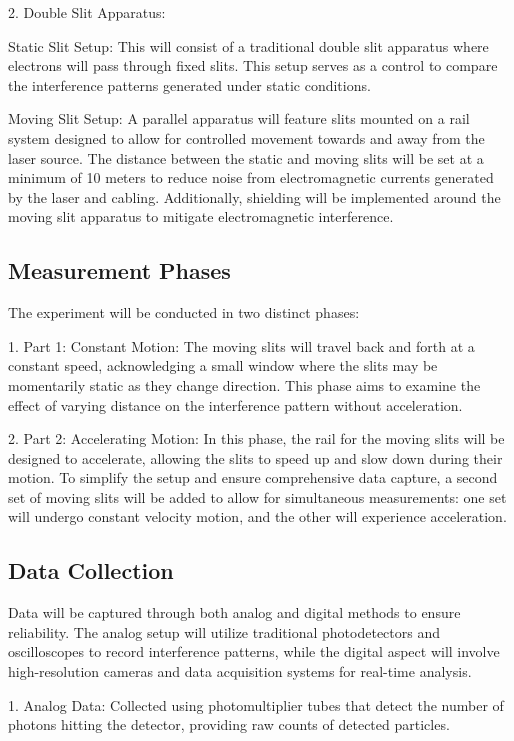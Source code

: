 \documentclass{article}
\begin{document}
2. Double Slit Apparatus:

Static Slit Setup: This will consist of a traditional double slit apparatus where electrons will pass through fixed slits. This setup serves as a control to compare the interference patterns generated under static conditions.

Moving Slit Setup: A parallel apparatus will feature slits mounted on a rail system designed to allow for controlled movement towards and away from the laser source. The distance between the static and moving slits will be set at a minimum of 10 meters to reduce noise from electromagnetic currents generated by the laser and cabling. Additionally, shielding will be implemented around the moving slit apparatus to mitigate electromagnetic interference.

\subsection{Measurement Phases}
The experiment will be conducted in two distinct phases:

1. Part 1: Constant Motion: The moving slits will travel back and forth at a constant speed, acknowledging a small window where the slits may be momentarily static as they change direction. This phase aims to examine the effect of varying distance on the interference pattern without acceleration.

2. Part 2: Accelerating Motion: In this phase, the rail for the moving slits will be designed to accelerate, allowing the slits to speed up and slow down during their motion. To simplify the setup and ensure comprehensive data capture, a second set of moving slits will be added to allow for simultaneous measurements: one set will undergo constant velocity motion, and the other will experience acceleration.

\subsection{Data Collection}
Data will be captured through both analog and digital methods to ensure reliability. The analog setup will utilize traditional photodetectors and oscilloscopes to record interference patterns, while the digital aspect will involve high-resolution cameras and data acquisition systems for real-time analysis.

1. Analog Data: Collected using photomultiplier tubes that detect the number of photons hitting the detector, providing raw counts of detected particles.
\end{document}
